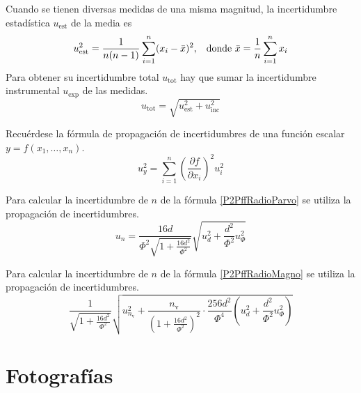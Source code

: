 \documentclass[12pt]{article}
\numberwithin{table}{section}
\numberwithin{figure}{section}
\numberwithin{equation}{section}
\begin{document}
Cuando se tienen diversas medidas de una misma magnitud, la incertidumbre estadística $u_{\text{est}}$ de la media es 
\begin{equation}\label{P2incest}
u_{\text{est}}^2=\frac{1}{n(n-1)}\sum_{i=1}^n(x_i-\bar{x})^2,\hspace{3mm}\text{donde }\bar{x}=\frac{1}{n}\sum_{i=1}^nx_i
\end{equation}
Para obtener su incertidumbre total $u_{\text{tot}}$ hay que sumar la incertidumbre instrumental $u_{\text{exp}}$ de las medidas.
\begin{equation}\label{P2incmedia}
u_{\text{tot}}=\sqrt{u_{\text{est}}^2+u_{\text{inc}}^2}
\end{equation}

Recuérdese la fórmula de propagación de incertidumbres de una función escalar $y=f(x_1,\ldots,x_n)$.
\begin{equation}\label{P2incprop}
u_y^2=\sum_{i=1}^n\left(\frac{\partial f}{\partial x_i}\right)^2u_i^2
\end{equation}

Para calcular la incertidumbre de $n$ de la fórmula \ref{P2PffRadioParvo} se utiliza la propagación de incertidumbres.
\begin{equation}\label{P2incradioparvo}
u_n=\frac{16d}{\Phi^2\sqrt{1+\frac{16d^2}{\Phi^2}}}\sqrt{u_d^2+\frac{d^2}{\Phi^2}u_\Phi^2}
\end{equation}

Para calcular la incertidumbre de $n$ de la fórmula \ref{P2PffRadioMagno} se utiliza la propagación de incertidumbres.
\begin{equation}\label{P2incradiomagno}
\frac{1}{\sqrt{1+\frac{16d^2}{\Phi^2}}}\sqrt{u_{n_\text{v}}^2+\frac{n_\text{v}}{\left(1+\frac{16d^2}{\Phi^2}\right)^2}\cdot\frac{256d^2}{\Phi^4}\left(u_d^2+\frac{d^2}{\Phi^2}u_\Phi^2\right)}
\end{equation}

\newpage
\section{Fotografías}
\end{document}
